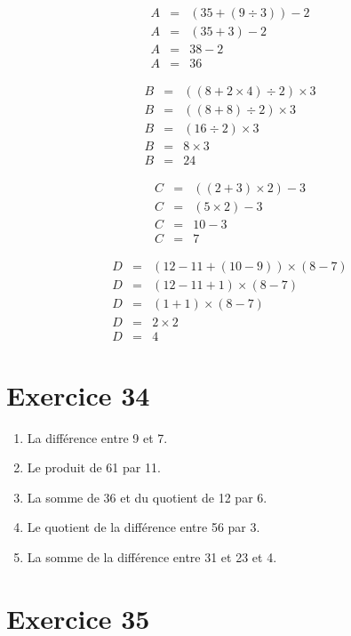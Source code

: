 \documentclass[12pt,a4paper]{extarticle}
\begin{document}
\begin{multicols}{2}
	\begin{eqnarray*}
		A &=& (35 + (9 \div 3)) - 2\\
		A &=& (35 + 3) - 2\\
		A &=& 38 - 2 \\
		A &=& 36
	\end{eqnarray*}
	
	\begin{eqnarray*}
		B &=& ((8 + 2 \times 4) \div 2) \times 3 \\
		B &=& ((8 + 8) \div 2) \times 3 \\
		B &=& (16 \div 2) \times 3 \\
		B &=& 8 \times 3 \\
		B &=& 24 
	\end{eqnarray*}
	
	\begin{eqnarray*}
		C &=& ((2+3)\times 2) - 3 \\
		C &=& (5\times 2) - 3 \\
		C &=& 10 - 3 \\
		C &=& 7
	\end{eqnarray*}
	
	\begin{eqnarray*}
		D &=& (12 - 11 + (10 - 9)) \times (8-7) \\
		D &=& (12 - 11 + 1) \times (8-7) \\
		D &=& (1 + 1) \times (8-7) \\
		D &=& 2 \times 2 \\
		D &=& 4
	\end{eqnarray*}
\end{multicols}

\section*{Exercice 34}

\begin{enumerate}[label = \alph*.]
	\item La différence entre 9 et 7.
	\item Le produit de 61 par 11.
	\item La somme de 36 et du quotient de 12 par 6.
	\item Le quotient  de la différence entre 56 par 3.
	\item La somme de la différence entre 31 et 23 et 4.
\end{enumerate}

\section*{Exercice 35}
\end{document}

